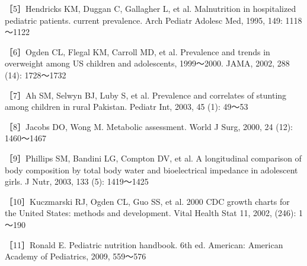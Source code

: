 ［5］Hendricks KM, Duggan C, Gallagher L, et al. Malnutrition in
hospitalized pediatric patients. current prevalence. Arch Pediatr
Adolesc Med, 1995, 149: 1118～1122

［6］Ogden CL, Flegal KM, Carroll MD, et al. Prevalence and trends in
overweight among US children and adolescents, 1999～2000. JAMA, 2002,
288 (14): 1728～1732

［7］Ah SM, Selwyn BJ, Luby S, et al. Prevalence and correlates of
stunting among children in rural Pakistan. Pediatr Int, 2003, 45 (1):
49～53

［8］Jacobs DO, Wong M. Metabolic assessment. World J Surg, 2000, 24
(12): 1460～1467

［9］Phillips SM, Bandini LG, Compton DV, et al. A longitudinal
comparison of body composition by total body water and bioelectrical
impedance in adolescent girls. J Nutr, 2003, 133 (5): 1419～1425

［10］Kuczmarski RJ, Ogden CL, Guo SS, et al. 2000 CDC growth charts for
the United States: methods and development. Vital Health Stat 11, 2002,
(246): 1～190

［11］Ronald E. Pediatric nutrition handbook. 6th ed. American: American
Academy of Pediatrics, 2009, 559～576

\protect\hypertarget{text00003.html}{}{}


